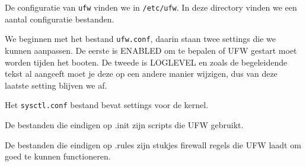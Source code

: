 De configuratie van \texttt{ufw} vinden we in \texttt{/etc/ufw}. In deze directory vinden we een aantal configuratie bestanden.

We beginnen met het bestand \texttt{ufw.conf}, daarin staan twee settings die we kunnen aanpassen. De eerste is ENABLED om te bepalen of UFW gestart moet worden tijden het booten. De tweede is LOGLEVEL en zoals de begeleidende tekst al aangeeft moet je deze op een andere manier wijzigen, dus van deze laatste setting blijven we af.

Het \texttt{sysctl.conf} bestand bevat settings voor de kernel.

De bestanden die eindigen op .init zijn scripts die UFW gebruikt.

De bestanden die eindigen op .rules zijn stukjes firewall regels die UFW laadt om goed te kunnen functioneren.

